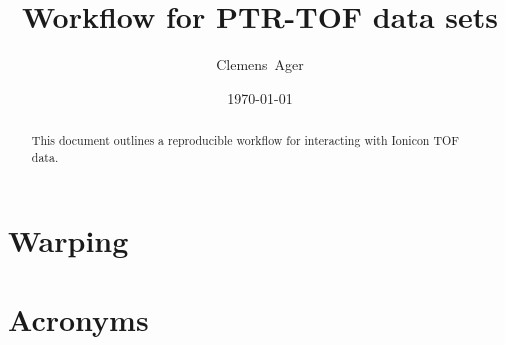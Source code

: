 \documentclass[twocolumn]{article}
\title{Workflow for PTR-TOF data sets}
\author{Clemens~Ager}
\date{\today}
\begin{document}
\maketitle

\begin{abstract}
  This document outlines a reproducible workflow for interacting with
  Ionicon TOF data.  
\end{abstract}


\setcounter{tocdepth}{2}
\tableofcontents



\section{Warping}



\appendix 
\section{Acronyms}




\end{document}
